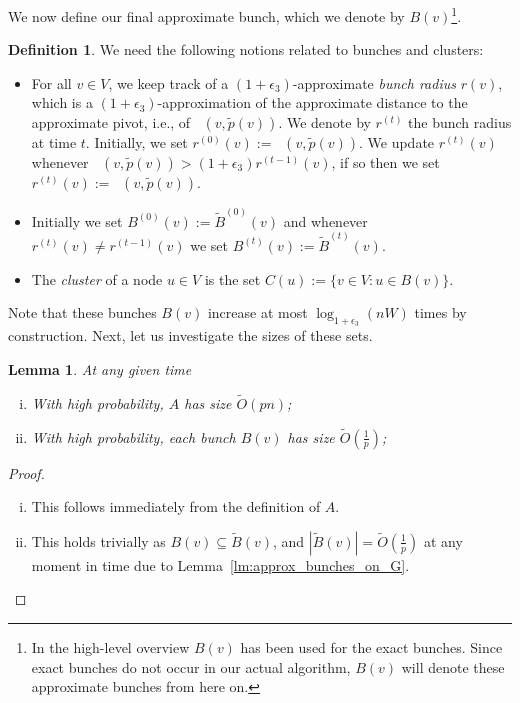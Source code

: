 \documentclass[11pt]{article}
\newtheorem{lemma}[theorem]{Lemma}
\theoremstyle{definition}
\newtheorem{definition}{Definition}
\theoremstyle{remark}
\DeclareMathOperator{\dLNbunch}{\delta_{\tilde{B}}}
\begin{document}
\begin{titlepage}
We now define our final approximate bunch, which we denote by $B(v)$\footnote{In the high-level overview $B(v)$ has been used for the exact bunches. Since exact bunches do not occur in our actual algorithm, $B(v)$ will denote these approximate bunches from here on.}.
\begin{definition}\label{def:app_app_bunch}
We need the following notions related to bunches and clusters:
\begin{itemize}
    \item For all $v \in V$, we keep track of a $(1+\epsilon_3)$-approximate \emph{bunch radius} $r(v)$, which is a $(1+\epsilon_3)$-approximation of the approximate distance to the approximate pivot, i.e., of $\dLNbunch(v,\tilde{p}(v))$. We denote by $r^{(t)}$ the bunch radius at time $t$. Initially, we set $r^{(0)}(v):=\dLNbunch(v,\tilde{p}(v))$. We update $r^{(t)}(v)$ whenever $\dLNbunch(v,\tilde{p}(v)) > (1+\epsilon_3)r^{(t-1)}(v)$, if so then we set $r^{(t)}(v):=\dLNbunch(v,\tilde{p}(v))$.
    \item Initially we set $B^{(0)}(v):= \tilde B^{(0)}(v)$ and whenever $r^{(t)}(v)\neq r^{(t-1)}(v)$ we set $B^{(t)}(v):=\tilde B^{(t)}(v)$.
    \item The \textit{cluster} of a node $u\in V$ is the set $C(u):= \{ v \in V: u \in B(v) \}$.
\end{itemize}    
\end{definition}


 Note that these bunches $B(v)$ increase at most $\log_{1+\epsilon_3}(nW)$ times by construction.
Next, let us investigate the sizes of these sets. 

\begin{lemma}\label{lm:size_heavy}
 At any given time
\begin{enumerate}[(i)]
    \item With high probability, $ A $ has size $\tilde O (p n) $; \label{item:size_A}
    \item With high probability, each bunch $B(v)$ has size $\tilde O (\tfrac{1}{p}) $;  \label{item:size_bunch}
\end{enumerate}
\end{lemma}
\begin{proof}
\begin{enumerate}[(i)]
    \item This follows immediately from the definition of $A$. 
    \item This holds trivially as $B(v)\subseteq \tilde B(v)$, and $|\tilde{B}(v)|=\tilde O(\tfrac{1}{p})$ at any moment in time due to Lemma~\ref{lm:approx_bunches_on_G}.\qedhere
\end{enumerate}
\end{proof}



\end{titlepage}
\end{document}
